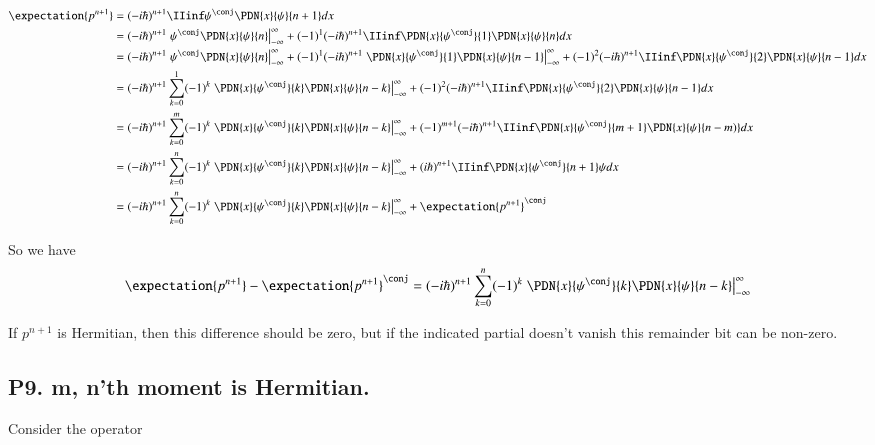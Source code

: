 \begin{align*}
\expectation{p^{n+1}} 
&= (-i\hbar)^{n+1} \IIinf \psi^\conj \PDN{x}{\psi}{n+1} dx \\
&= 
(-i\hbar)^{n+1} \left. \psi^\conj \PDN{x}{\psi}{n} \right\vert_{-\infty}^{\infty}
+(-1)^{1}(-i\hbar)^{n+1} \IIinf \PDN{x}{\psi^\conj}{1} \PDN{x}{\psi}{n} dx 
\\
&= 
(-i\hbar)^{n+1} \left. \psi^\conj \PDN{x}{\psi}{n} \right\vert_{-\infty}^{\infty}
+(-1)^{1}(-i\hbar)^{n+1} \left. \PDN{x}{\psi^\conj}{1} \PDN{x}{\psi}{n-1} \right\vert_{-\infty}^{\infty}
+(-1)^{2}(-i\hbar)^{n+1} \IIinf \PDN{x}{\psi^\conj}{2} \PDN{x}{\psi}{n-1} dx 
\\
&= 
(-i\hbar)^{n+1} \sum_{k=0}^1
(-1)^{k}
\left. \PDN{x}{\psi^\conj}{k} \PDN{x}{\psi}{n-k} \right\vert_{-\infty}^{\infty}
+(-1)^{2}(-i\hbar)^{n+1} \IIinf \PDN{x}{\psi^\conj}{2} \PDN{x}{\psi}{n-1} dx  
\\
&= 
(-i\hbar)^{n+1} \sum_{k=0}^m
(-1)^{k}
\left. \PDN{x}{\psi^\conj}{k} \PDN{x}{\psi}{n-k} \right\vert_{-\infty}^{\infty}
+(-1)^{m+1}(-i\hbar)^{n+1} \IIinf \PDN{x}{\psi^\conj}{m+1} \PDN{x}{\psi}{n-m)} dx 
\\
&= 
(-i\hbar)^{n+1} \sum_{k=0}^n
(-1)^{k}
\left. \PDN{x}{\psi^\conj}{k} \PDN{x}{\psi}{n-k} \right\vert_{-\infty}^{\infty}
+(i\hbar)^{n+1} \IIinf \PDN{x}{\psi^\conj}{n+1} \psi dx 
\\
&= 
(-i\hbar)^{n+1} \sum_{k=0}^n
(-1)^{k}
\left. \PDN{x}{\psi^\conj}{k} \PDN{x}{\psi}{n-k} \right\vert_{-\infty}^{\infty}
+
\expectation{p^{n+1}}^\conj
\\
\end{align*}

So we have
\begin{align*}
\expectation{p^{n+1}} - \expectation{p^{n+1}}^\conj
&= 
(-i\hbar)^{n+1} \sum_{k=0}^n
(-1)^{k}
\left. \PDN{x}{\psi^\conj}{k} \PDN{x}{\psi}{n-k} \right\vert_{-\infty}^{\infty}
\\
\end{align*}

If $p^{n+1}$ is Hermitian, then this difference should be zero, but if the indicated partial doesn't vanish this
remainder bit can be non-zero.

\subsection{P9. m, n'th moment is Hermitian. }

Consider the operator 

